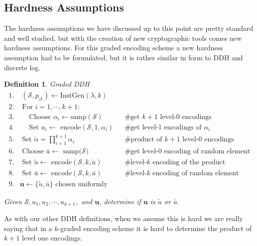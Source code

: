 \documentclass[12pt,twoside]{reedthesis}
\newtheorem{definition}{Definition}
\begin{document}
    
    
    
    \subsection{Hardness Assumptions}
    
    The hardness assumptions we have discussed up to this point are pretty standard and well studied, but with the creation of new cryptographic tools comes new hardness assumptions. For this graded encoding scheme a new hardness assumption had to be formulated, but it is rather similar in form to DDH and discrete log.
        
    \begin{definition}{Graded DDH}
    \begin{align*}
    1. &\; (\mathcal{S},p_{zt}) \leftarrow \text{InstGen}(\lambda,k) && \\
    2. & \text{ For } i = 1,\cdots,k+1: && \\
    3. &\quad \text{ Choose } \alpha_i \leftarrow \text{samp}(\mathcal{S}) && \text{\# get $k+1$ level-0 encodings} \\
    4. &\quad \text{ Set $u_i \leftarrow$ encode$(\mathcal{S},1,\alpha_i)$} &&\text{\# get level-1 encodings of $\alpha_i$} \\
    5. & \text{ Set $\tilde{\alpha} = \prod_{i=1}^{k+1}$}\alpha_i &&\text{\# product of $k+1$ level-0 encodings} \\
    6. & \text{ Choose $\bar{a} \leftarrow$ samp($\mathcal{S}$)} &&\text{\# get level-0 encoding of random element} \\
    7. & \text{ Set $\tilde{u} \leftarrow$ encode$(\mathcal{S},k,\tilde{a})$} &&\text{\# level-$k$ encoding of the product} \\
    8. & \text{ Set $\bar{u}\leftarrow$ encode$(\mathcal{S},k,\bar{a})$} &&\text{\# level-$k$ encoding of random element} \\
    9. & \boldsymbol{u} \leftarrow \{\tilde{u},\bar{u} \} \text{ chosen uniformly} &&
    \end{align*}
    \par Given $\mathcal{S},u_1,u_2,\cdots,u_{k+1},$ and $\boldsymbol{u}$, determine if $\boldsymbol{u}$ is $\tilde{u}$ or $\bar{u}$.
    \end{definition}
    
    As with our other DDH definitions, when we assume this is hard we are really saying that in a $k$-graded encoding scheme it is hard to determine the product of $k+1$ level one encodings. 
    
\end{document}
